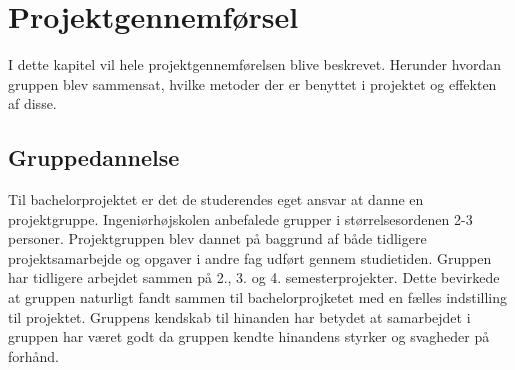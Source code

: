 \chapter{Projektgennemførsel}
I dette kapitel vil hele projektgennemførelsen blive beskrevet. Herunder hvordan
gruppen blev sammensat, hvilke metoder der er benyttet i projektet og effekten af disse.

\section{Gruppedannelse}
Til bachelorprojektet er det de studerendes eget ansvar at danne en projektgruppe. 
Ingeniørhøjskolen anbefalede grupper i størrelsesordenen 2-3 personer. Projektgruppen
blev dannet på baggrund af både tidligere projektsamarbejde og opgaver i andre fag udført gennem studietiden. 
Gruppen har tidligere arbejdet sammen på 2., 3. og 4. semesterprojekter.
Dette bevirkede at gruppen naturligt fandt sammen til bachelorprojketet med en fælles indstilling til projektet.
Gruppens kendskab til hinanden har betydet at samarbejdet i gruppen har været godt da gruppen kendte hinandens styrker og svagheder på forhånd. \\